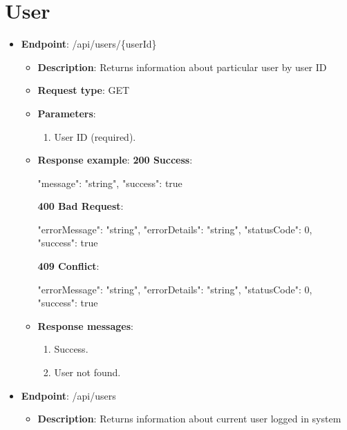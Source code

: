 \section{User}\label{sec:user}
\begin{itemize}
    \item \textbf{Endpoint}: /api/users/\{userId\}
    \begin{itemize}
        \item \textbf{Description}: Returns information about particular user by user ID
        \item \textbf{Request type}: GET
        \item \textbf{Parameters}:
        \begin{enumerate}
            \item User ID (required).
        \end{enumerate}
        \item \textbf{Response example}:
        \textbf{200 Success}:
        \begin{spverbatim}
        {
            "message": "string",
            "success": true
        }
        \end{spverbatim}
        \textbf{400 Bad Request}:
        \begin{spverbatim}
        {
            "errorMessage": "string",
            "errorDetails": "string",
            "statusCode": 0,
            "success": true
        }
        \end{spverbatim}
        \textbf{409 Conflict}:
        \begin{spverbatim}
        {
            "errorMessage": "string",
            "errorDetails": "string",
            "statusCode": 0,
            "success": true
        }
        \end{spverbatim}
        \item \textbf{Response messages}:
        \begin{enumerate}
            \item Success.
            \item User not found.
        \end{enumerate}
    \end{itemize}
    \item \textbf{Endpoint}: /api/users
    \begin{itemize}
        \item \textbf{Description}: Returns information about current user logged in system

\end{itemize}
\end{itemize}
